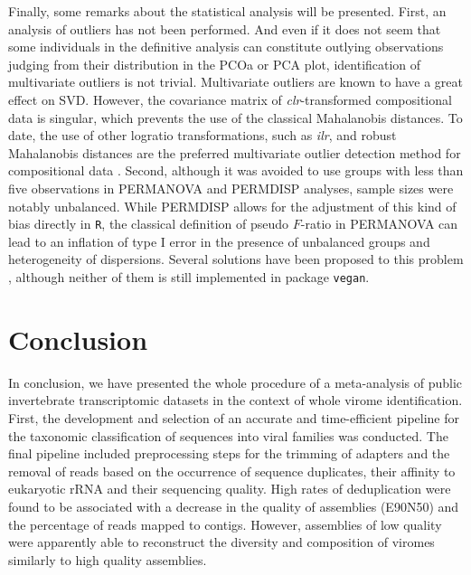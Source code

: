 \documentclass[
  openany]{book}
\begin{document}
Finally, some remarks about the statistical analysis will be presented. First, an analysis of outliers has not been performed. And even if it does not seem that some individuals in the definitive analysis can constitute outlying observations judging from their distribution in the PCOa or PCA plot, identification of multivariate outliers is not trivial. Multivariate outliers are known to have a great effect on SVD. However, the covariance matrix of \emph{clr}-transformed compositional data is singular, which prevents the use of the classical Mahalanobis distances. To date, the use of other logratio transformations, such as \emph{ilr}, and robust Mahalanobis distances are the preferred multivariate outlier detection method for compositional data \autocite{Filzmoser2012}. Second, although it was avoided to use groups with less than five observations in PERMANOVA and PERMDISP analyses, sample sizes were notably unbalanced. While PERMDISP allows for the adjustment of this kind of bias directly in \texttt{R}, the classical definition of pseudo \(F\)-ratio in PERMANOVA can lead to an inflation of type I error in the presence of unbalanced groups and heterogeneity of dispersions. Several solutions have been proposed to this problem \autocite{Anderson2017b,Alekseyenko2016}, although neither of them is still implemented in package \texttt{vegan}.

\hypertarget{conclusion}{%
\section{Conclusion}\label{conclusion}}

In conclusion, we have presented the whole procedure of a meta-analysis of public invertebrate transcriptomic datasets in the context of whole virome identification. First, the development and selection of an accurate and time-efficient pipeline for the taxonomic classification of sequences into viral families was conducted. The final pipeline included preprocessing steps for the trimming of adapters and the removal of reads based on the occurrence of sequence duplicates, their affinity to eukaryotic rRNA and their sequencing quality. High rates of deduplication were found to be associated with a decrease in the quality of assemblies (E90N50) and the percentage of reads mapped to contigs. However, assemblies of low quality were apparently able to reconstruct the diversity and composition of viromes similarly to high quality assemblies.
\end{document}
